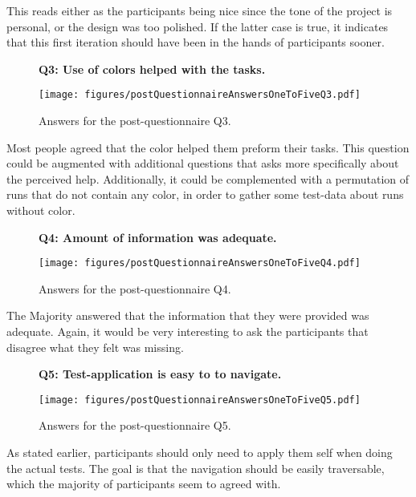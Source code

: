     This reads either as the participants being nice since the tone of the
    project is personal, or the design was too polished. If the latter case
    is true, it indicates that this first iteration should have been in the
    hands of participants sooner.

    \begin{figure}[h!]
      \textbf{Q3: Use of colors helped with the tasks.}
      \begin{center}
        \texttt{[image: figures/postQuestionnaireAnswersOneToFiveQ3.pdf]}
        \vspace{-1cm}
        \caption{Answers for the post-questionnaire Q3.}
      \end{center}
    \end{figure}

    Most people agreed that the color helped them preform their tasks.
    This question could be augmented with additional questions that asks
    more specifically about the perceived help. Additionally, it could be
    complemented with a permutation of runs that do not contain any color,
    in order to gather some test-data about runs without color.

    \begin{figure}[h!]
      \textbf{Q4: Amount of information was adequate.}
      \begin{center}
        \texttt{[image: figures/postQuestionnaireAnswersOneToFiveQ4.pdf]}
        \vspace{-1cm}
        \caption{Answers for the post-questionnaire Q4.}
      \end{center}
    \end{figure}

    The Majority answered that the information that they were provided was
    adequate. Again, it would be very interesting to ask the participants
    that disagree what they felt was missing.

    \begin{figure}[h!]
      \textbf{Q5: Test-application is easy to to navigate.}
      \begin{center}
        \texttt{[image: figures/postQuestionnaireAnswersOneToFiveQ5.pdf]}
        \vspace{-1cm}
        \caption{Answers for the post-questionnaire Q5.}
      \end{center}
    \end{figure}

    As stated earlier, participants should only need to apply them self
    when doing the actual tests. The goal is that the navigation should be
    easily traversable, which the majority of participants seem to agreed with.

